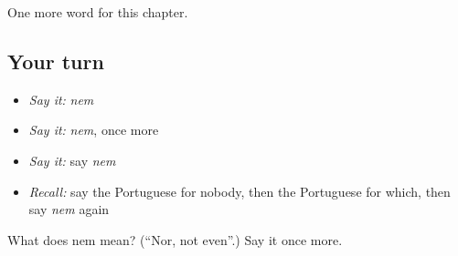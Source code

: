 \begin{grammarlens}[title={What you've built}]
One more word for this chapter.
\end{grammarlens}

\subsection*{Your turn}
\begin{itemize}
\raggedright
  \item \emph{Say it:} \emph{nem}
  \item \emph{Say it:} \emph{nem}, once more
  \item \emph{Say it:} say \emph{nem}
  \item \emph{Recall:} say the Portuguese for nobody, then the Portuguese for which, then say \emph{nem} again
\end{itemize}

\begin{tcolorbox}[breakable,colback=teal!4,colframe=teal!35!black,title={Before you move on}]
What does nem mean? (\textquotedblleft{}Nor, not even\textquotedblright{}.) Say it once more.
\end{tcolorbox}
